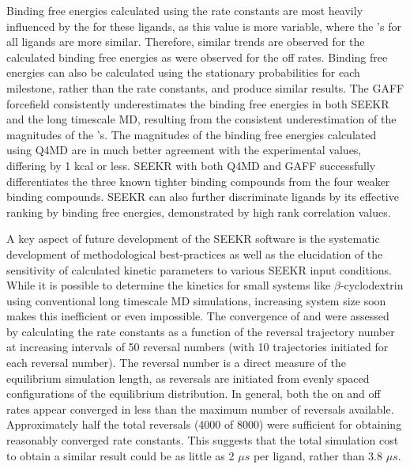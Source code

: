 Binding free energies calculated using the rate constants
are most heavily influenced by the \koff for these ligands, as this value is more variable, where
the \kon's for all ligands are more similar. Therefore, similar trends are observed
for the calculated binding free energies as were observed for the off rates.
Binding free energies can also be calculated using the stationary probabilities
for each milestone, rather than the rate constants, and produce similar results.
The GAFF forcefield consistently underestimates the binding free energies in both
SEEKR and the long timescale MD, resulting from the consistent underestimation
of the magnitudes of the \koff's. The magnitudes of the binding free
energies calculated using Q4MD are in much better agreement with the experimental
values, differing by 1 kcal or less. SEEKR with both Q4MD and GAFF successfully
differentiates the three known tighter binding compounds from the four weaker binding compounds.
SEEKR can also further discriminate ligands
by its effective ranking %
by binding free energies, demonstrated by high rank correlation values.


\par A key aspect of future development of the SEEKR software is the systematic
development of methodological best-practices as well as the elucidation of the
sensitivity of calculated kinetic parameters to various SEEKR input conditions.
While it is possible to determine the kinetics for small systems like
$\beta$-cyclodextrin using conventional long timescale MD simulations, increasing
system size soon makes this inefficient or even impossible.
The convergence of \kon and \koff were assessed by calculating the rate
constants as a function of the reversal trajectory number at increasing intervals
of 50 reversal numbers (with 10 trajectories initiated for each reversal number).
The reversal number is a direct measure of the equilibrium simulation length, as
reversals are initiated from evenly spaced configurations of the equilibrium distribution.
In general, both the on and off rates appear converged in less than the maximum
number of reversals available. Approximately half the total reversals
(4000 of 8000) were sufficient for obtaining reasonably converged rate constants.
This suggests that the total simulation cost to obtain a similar result could be
as little as 2 ${\mu}s$ per ligand, rather than 3.8 ${\mu}s$.

